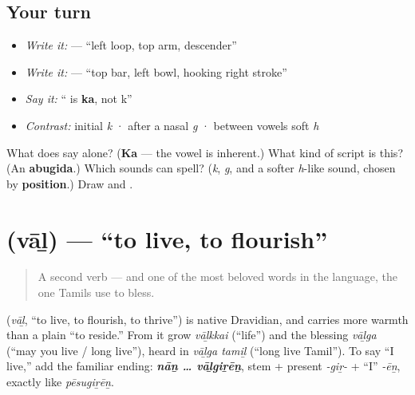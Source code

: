 \subsection*{Your turn}
\begin{itemize}
\raggedright
  \item \emph{Write it:}  — \textquotedblleft{}left loop, top arm, descender\textquotedblright{}
  \item \emph{Write it:}  — \textquotedblleft{}top bar, left bowl, hooking right stroke\textquotedblright{}
  \item \emph{Say it:} \textquotedblleft{} is \textbf{ka}, not k\textquotedblright{}
  \item \emph{Contrast:} initial \emph{k} · after a nasal \emph{g} · between vowels soft \emph{h}
\end{itemize}

\begin{tcolorbox}[breakable,colback=teal!4,colframe=teal!35!black,title={Before you move on}]
What does \textbf{} say alone? (\textbf{Ka} — the vowel is inherent.) What kind of script is this? (An \textbf{abugida}.) Which sounds can  spell? (\emph{k}, \emph{g}, and a softer \emph{h}-like sound, chosen by \textbf{position}.) Draw \textbf{} and \textbf{}.
\end{tcolorbox}
\section[\texorpdfstring{\ta{வாழ்} (vāḻ)}{வாழ் (vāḻ)}]{ (vāḻ) — \textquotedblleft{}to live, to flourish\textquotedblright{}}

\label{lesson:TA-C05-vaazh}



\begin{quote}
A second verb — and one of the most beloved words in the language, the one Tamils use to bless.
\end{quote}

\begin{cousinweb}
\textbf{} (\emph{vāḻ}, \textquotedblleft{}to live, to flourish, to thrive\textquotedblright{}) is native Dravidian, and carries more warmth than a plain \textquotedblleft{}to reside.\textquotedblright{} From it grow \emph{vāḻkkai} (\textquotedblleft{}life\textquotedblright{}) and the blessing \emph{vāḻga} (\textquotedblleft{}may you live / long live\textquotedblright{}), heard in \emph{vāḻga tamiḻ} (\textquotedblleft{}long live Tamil\textquotedblright{}). To say \textquotedblleft{}I live,\textquotedblright{} add the familiar ending: \emph{\textbf{nāṉ … vāḻgiṟēṉ}}, stem + present \emph{-giṟ-} + \textquotedblleft{}I\textquotedblright{} \emph{-ēṉ}, exactly like \emph{pēsugiṟēṉ}.
\end{cousinweb}

